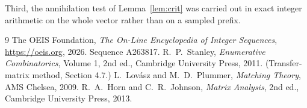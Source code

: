 \documentclass[11pt,a4paper]{article}
\theoremstyle{plain}
\theoremstyle{definition}
\begin{document}
Third, the annihilation test of Lemma~\ref{lem:crit} was carried out in exact integer
arithmetic on the whole vector rather than on a sampled prefix.

\begin{thebibliography}{9}
 The OEIS Foundation, \emph{The On-Line Encyclopedia of Integer
Sequences}, \url{https://oeis.org}, 2026. Sequence A263817.
 R.~P.~Stanley, \emph{Enumerative Combinatorics}, Volume 1, 2nd ed.,
Cambridge University Press, 2011. (Transfer-matrix method, Section 4.7.)
 L.~Lov\'asz and M.~D.~Plummer, \emph{Matching Theory}, AMS Chelsea, 2009.
 R.~A.~Horn and C.~R.~Johnson, \emph{Matrix Analysis}, 2nd ed., Cambridge
University Press, 2013.
\end{thebibliography}
\end{document}
